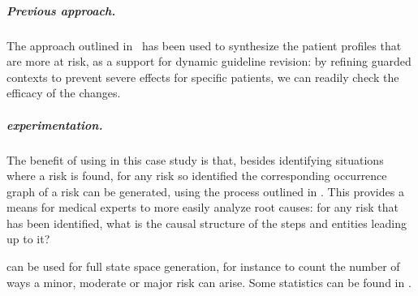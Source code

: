 \subparagraph*{Previous approach.}
The approach outlined in~\cite{DBLP:conf/cmsb/BowlesBBFGM24} has been used to synthesize the patient profiles that are more at risk, as a support for dynamic guideline revision: by refining guarded contexts to prevent severe effects for specific patients, we can readily check the efficacy of the changes.

\subparagraph*{\GROOVE experimentation.}

The benefit of using \GROOVE in this case study is that, besides identifying situations where a risk is found, for any risk so identified the corresponding occurrence graph of a risk can be generated, using the process outlined in . This provides a means for medical experts to more easily analyze root causes: for any risk that has been identified, what is the causal structure of the steps and entities leading up to it?

\GROOVE can be used for full state space generation, for instance to count the number of ways a minor, moderate or major risk can arise. Some statistics can be found in .

